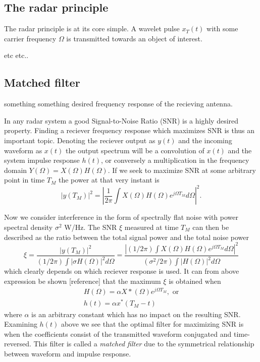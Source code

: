 \documentclass[a4paper, 12pt]{article}
\begin{document}
\subsection{The radar principle}

The radar principle is at its core simple.  A wavelet pulse $x_T(t)$ with some carrier frequency $\Omega$  is transmitted towards an object of interest. 

etc etc..


\subsection{Matched filter}

something something desired frequency response of the recieving antenna. 

In any radar system a good Signal-to-Noise Ratio (SNR) is a highly desired property. Finding a reciever frequency response which maximizes SNR is thus an important topic. Denoting the reciever output as $y(t)$ and the incoming waveform as $x(t)$ the output spectrum will be a convolution of $x(t)$ and the system impulse response $h(t)$, or conversely a multiplication in the frequency domain $Y(\Omega) = X(\Omega)H(\Omega)$. If we seek to maximize SNR at some arbitrary point in time $T_M$ the power at that very instant is
%
\begin{equation}
	|y(T_M)|^{2} = |\frac{1}{2\pi}\int X(\Omega)H(\Omega)e^{j\Omega T_M} d\Omega|^{2}.
\end{equation}

Now we consider interference in the form of spectrally flat noise with power spectral density $\sigma^2$ W/Hz. The SNR $\xi$ measured at time $T_M$ can then be described as the ratio between the total signal power and the total noise power
%
\begin{equation}
	\xi
	= \frac{|y(T_M)|^{2}}{(1/2\pi)\int|\sigma H(\Omega)|^{2}d\Omega}
	= \frac{|(1/2\pi)\int X(\Omega)H(\Omega)e^{j\Omega T_M}d\Omega|^2}{(\sigma^2/2\pi)\int|H(\Omega)|^{2}d\Omega}
\end{equation}
%
which clearly depends on which reciever response is used. It can from above expression be shown [reference] that the maximum $\xi$ is obtained when 
%
\begin{gather}
 H(\Omega) = \alpha X*(\Omega)e^{j\Omega T_M}, \text{ or} \\
\label{eq:123}
h(t) = \alpha x^*(T_M - t)
\end{gather}
%
where $\alpha$ is an arbitrary constant which has no impact on the resulting SNR. Examining $h(t)$ above we see that the optimal filter for maximizing SNR is when the coefficients consist of the transmitted waveform conjugated and time-reversed. This filter is called a \emph{matched filter} due to the symmetrical relationship between waveform and impulse response.
\end{document}
